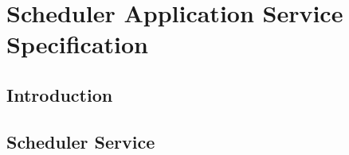\chapter{Scheduler Application Service Specification}
\section{Introduction}
\section{Scheduler Service}
\orgcishellappservicescheduler{}
